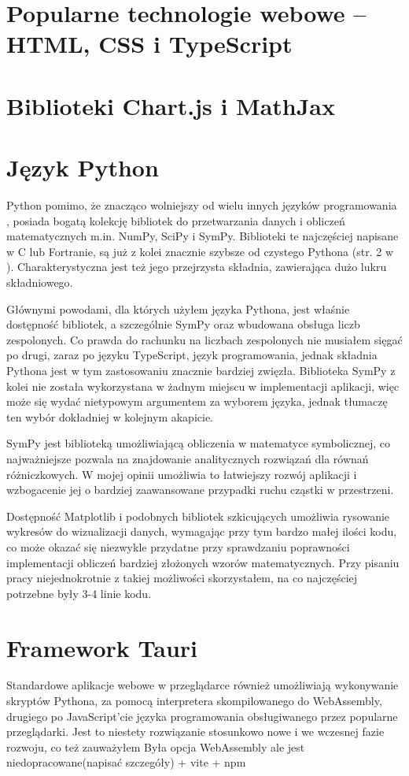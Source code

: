\documentclass{SGGW-thesis}
\begin{document}
	\section{Popularne technologie webowe -- HTML, CSS i TypeScript}
	\section{Biblioteki Chart.js i MathJax}
	\section{Język Python}
	Python pomimo, że znacząco wolniejszy od wielu innych języków programowania \cite{Python slow}, posiada bogatą kolekcję bibliotek do przetwarzania danych i obliczeń matematycznych m.in. NumPy, SciPy i SymPy. Biblioteki te najczęściej napisane w C lub Fortranie, są już z kolei znacznie szybsze od czystego Pythona (str. 2 w \cite{Python libs}). Charakterystyczna jest też jego przejrzysta składnia, zawierająca dużo lukru składniowego\cite{Python sugar}.
	
	Głównymi powodami, dla których użyłem języka Pythona, jest właśnie dostępność bibliotek, a szczególnie SymPy oraz wbudowana obsługa liczb zespolonych. Co prawda do rachunku na liczbach zespolonych nie musiałem sięgać po drugi, zaraz po języku TypeScript, język programowania, jednak składnia Pythona jest w tym zastosowaniu znacznie bardziej zwięzła. Biblioteka SymPy z kolei nie została wykorzystana w żadnym miejscu w implementacji aplikacji, więc może się wydać nietypowym argumentem za wyborem języka, jednak tłumaczę ten wybór dokładniej w kolejnym akapicie. 
	
	SymPy jest biblioteką umożliwiającą obliczenia w matematyce symbolicznej\cite{SymPy}, co najważniejsze pozwala na znajdowanie analitycznych rozwiązań dla równań różniczkowych. W mojej opinii umożliwia to łatwiejszy rozwój aplikacji i wzbogacenie jej o bardziej zaawansowane przypadki ruchu cząstki w przestrzeni.
	
	Dostępność Matplotlib i podobnych bibliotek szkicujących umożliwia rysowanie wykresów do wizualizacji danych, wymagając przy tym bardzo małej ilości kodu, co może okazać się niezwykle przydatne przy sprawdzaniu poprawności implementacji obliczeń bardziej złożonych wzorów matematycznych. Przy pisaniu pracy niejednokrotnie z takiej możliwości skorzystałem, na co najczęściej potrzebne były 3-4 linie kodu.
	
	\section{Framework Tauri}
	Standardowe aplikacje webowe w przeglądarce również umożliwiają wykonywanie skryptów Pythona, za pomocą interpretera skompilowanego do WebAssembly\cite{WebAssembly Python}, drugiego po JavaScript'cie języka programowania obsługiwanego przez popularne przeglądarki\cite{browser langs}. Jest to niestety rozwiązanie stosunkowo nowe i we wczesnej fazie rozwoju\cite{wasm beta}, co też zauważyłem 
	Była opcja WebAssembly ale jest niedopracowane(napisać szczegóły)
	+ vite + npm
	
\end{document}
